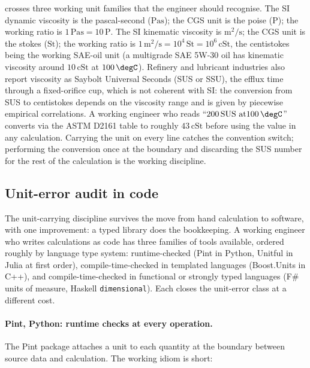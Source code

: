  crosses three working unit families
that the engineer should recognise. The SI dynamic viscosity is
the pascal-second ($\si{\pascal\second}$); the CGS unit is the poise
($\text{P}$); the working ratio is $1 \,\si{\pascal\second} = 10 \,
\text{P}$. The SI kinematic viscosity is $\si{\meter\squared\per
\second}$; the CGS unit is the stokes ($\text{St}$); the working
ratio is $1 \,\si{\meter\squared\per\second} = 10^{4} \,\text{St}
= 10^{6} \,\text{cSt}$, the centistokes being the working SAE-oil unit (a
multigrade SAE 5W-30 oil has kinematic viscosity around $10 \,
\text{cSt}$ at $100 \,\degC$). Refinery and lubricant industries
also report viscosity as Saybolt Universal Seconds (SUS or SSU),
the efflux time through a fixed-orifice cup, which is not coherent
with SI: the conversion from SUS to centistokes depends on the
viscosity range and is given by piecewise empirical correlations.
A working engineer who reads ``$200 \,\text{SUS at} 100 \,\degC$''
converts via the ASTM D2161 table to roughly $43 \,\text{cSt}$
before using the value in any calculation. Carrying the unit on
every line catches the convention switch; performing the conversion
once at the boundary and discarding the SUS number for the rest of
the calculation is the working discipline.

\subsection{Unit-error audit in code}

The unit-carrying discipline survives the move from hand calculation
to software, with one improvement: a typed library does the
bookkeeping. A working engineer who writes calculations as code has
three families of tools available, ordered roughly by language type
system: runtime-checked (Pint in Python, Unitful in Julia at first
order), compile-time-checked in templated languages
(Boost.Units in C++), and compile-time-checked in functional or
strongly typed languages (F\# units of measure, Haskell
\texttt{dimensional}). Each closes the unit-error class at a
different cost.

\paragraph{Pint, Python: runtime checks at every operation.}
The Pint package \cite{web:ch02t3-pint} attaches a unit to each
quantity at the boundary between source data and calculation. The
working idiom is short:

